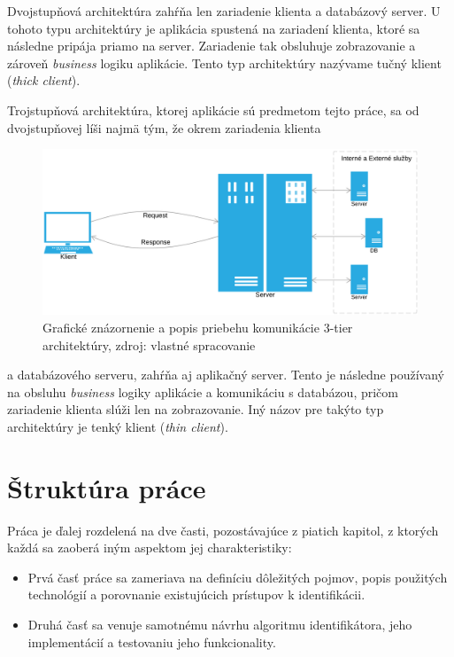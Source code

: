 \documentclass[
  digital, %
  table,   %
  lof,     %
  nolot,   %
  nocover
]{fithesis3}
\begin{document}
Dvojstupňová architektúra zahŕňa len zariadenie klienta a databázový server.
U tohoto typu architektúry je aplikácia spustená na zariadení klienta, ktoré sa
následne pripája priamo na server. Zariadenie tak obsluhuje zobrazovanie a zároveň
\textit{business} logiku aplikácie. Tento typ architektúry
nazývame tučný klient (\textit{thick client}). 

Trojstupňová architektúra, ktorej aplikácie sú predmetom tejto práce, sa od
dvojstupňovej líši najmä tým, že okrem zariadenia klienta

\begin{figure}[H]
  \centering
    \includegraphics[width=\textwidth]{images/C-S-thin.png}
  \caption{Grafické znázornenie a popis priebehu komunikácie 3-tier architektúry,
  zdroj: vlastné spracovanie}
  \label{fig:cs-thin}
\end{figure}

\noindent a databázového serveru, zahŕňa aj aplikačný server. Tento je následne používaný na obsluhu
\textit{business} logiky aplikácie a komunikáciu s databázou, pričom zariadenie
klienta slúži len na zobrazovanie. Iný názov pre takýto typ architektúry je tenký
klient (\textit{thin client}). \cite{Oluwatosin:2014:CS}

\section{Štruktúra práce}
Práca je ďalej rozdelená na dve časti, pozostávajúce z piatich kapitol, z ktorých každá sa zaoberá iným aspektom
jej charakteristiky:
\begin{itemize}
\item Prvá časť práce sa zameriava na
definíciu dôležitých pojmov, popis použitých technológií a porovnanie existujúcich prístupov k identifikácii.
\item Druhá časť sa venuje samotnému návrhu algoritmu identifikátora, jeho implementácií a testovaniu jeho funkcionality.
\end{itemize}
\end{document}

